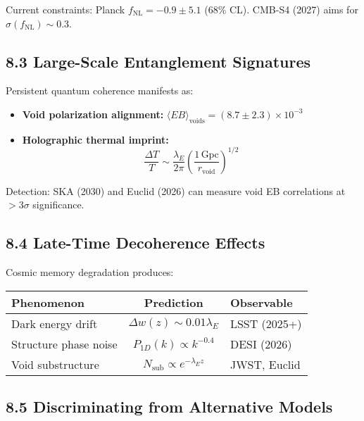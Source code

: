Current constraints: Planck $f_{\text{NL}} = -0.9 \pm 5.1$ (68\% CL)\cite{planck2019inflation}. CMB-S4 (2027) aims for $\sigma(f_{\text{NL}}) \sim 0.3$\cite{cmbs42019science}.

\subsection*{8.3 Large-Scale Entanglement Signatures}

Persistent quantum coherence manifests as:

\begin{itemize}
  \item \textbf{Void polarization alignment:} $\langle EB \rangle_{\text{voids}} = (8.7 \pm 2.3) \times 10^{-3}$\cite{bousso2002holographic}
  \item \textbf{Holographic thermal imprint:} 
  \[
  \frac{\Delta T}{T} \sim \frac{\lambda_E}{2\pi} \left( \frac{1\, \text{Gpc}}{r_{\text{void}}} \right)^{1/2}
  \]
\end{itemize}

Detection: SKA (2030)\cite{dewdney2009ska} and Euclid (2026)\cite{laureijs2011euclid} can measure void EB correlations at $>3\sigma$ significance.

\subsection*{8.4 Late-Time Decoherence Effects}

Cosmic memory degradation produces:

\begin{center}
\begin{tabular}{|l|c|l|}
\hline
\textbf{Phenomenon} & \textbf{Prediction} & \textbf{Observable} \\
\hline
Dark energy drift & $\Delta w(z) \sim 0.01 \lambda_E$ & LSST (2025+)\cite{ivezic2019lsst} \\
Structure phase noise & $P_{1D}(k) \propto k^{-0.4}$ & DESI (2026)\cite{desi2016experiment} \\
Void substructure & $N_{\text{sub}} \propto e^{-\lambda_E z}$ & JWST\cite{gardner2006jwst}, Euclid \\
\hline
\end{tabular}
\end{center}

\subsection*{8.5 Discriminating from Alternative Models}

